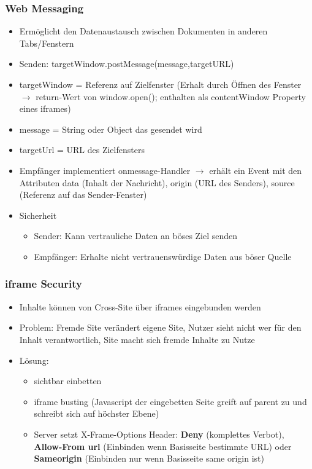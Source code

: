 \documentclass{article} %
\begin{document}
	\subsubsection{Web Messaging}
	\begin{itemize}
		\item Ermöglicht den Datenaustausch zwischen Dokumenten in anderen Tabs/Fenstern
		\item Senden: targetWindow.postMessage(message,targetURL)
		\item targetWindow = Referenz auf Zielfenster (Erhalt durch Öffnen des Fenster $\rightarrow$ return-Wert von window.open(); enthalten als contentWindow Property eines iframes)
		\item message = String oder Object das gesendet wird
		\item targetUrl = URL des Zielfensters
		\item Empfänger implementiert onmessage-Handler $\rightarrow$ erhält ein Event mit den Attributen data (Inhalt der Nachricht), origin (URL des Senders), source (Referenz auf das Sender-Fenster)
		\item Sicherheit
		\begin{itemize}
			\item Sender: Kann vertrauliche Daten an böses Ziel senden 
			\item Empfänger: Erhalte nicht vertrauenswürdige Daten aus böser Quelle
		\end{itemize}
	\end{itemize}
	\subsubsection{iframe Security}
	\begin{itemize}
		\item Inhalte können von Cross-Site über iframes eingebunden werden
		\item Problem: Fremde Site verändert eigene Site, Nutzer sieht nicht wer für den Inhalt verantwortlich, Site macht sich fremde Inhalte zu Nutze
		\item Lösung:
		\begin{itemize}
			\item sichtbar einbetten
			\item iframe busting (Javascript der eingebetten Seite greift auf parent zu und schreibt sich auf höchster Ebene)
			\item Server setzt X-Frame-Options Header: \textbf{Deny }(komplettes Verbot), \textbf{Allow-From url} (Einbinden wenn Basisseite bestimmte URL) oder \textbf{Sameorigin} (Einbinden nur wenn Basisseite same origin ist)
		\end{itemize}
	\end{itemize}
\end{document}
